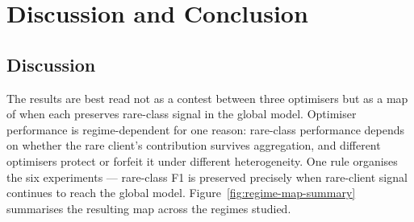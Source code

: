 \documentclass[11pt,a4paper]{report}
\begin{document}











\chapter{Discussion and Conclusion}
\label{ch:discussion}

\section{Discussion}
\label{sec:disc}

The results are best read not as a contest between three optimisers but as a map
of when each preserves rare-class signal in the global model. Optimiser
performance is regime-dependent for one reason: rare-class performance depends on
whether the rare client's contribution survives aggregation, and different
optimisers protect or forfeit it under different heterogeneity. One rule organises
the six experiments --- rare-class F1 is preserved precisely when rare-client
signal continues to reach the global model. Figure~\ref{fig:regime-map-summary}
summarises the resulting map across the regimes studied.
\end{document}
